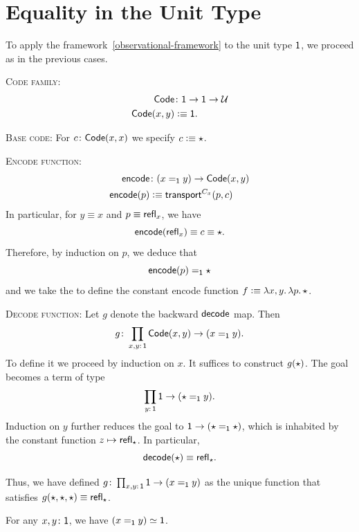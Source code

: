 \section{Equality in the Unit Type}

To apply the framework~\ref{observational-framework} to the unit type $\mathsf{1}$, we proceed as in the previous cases.

\textsc{Code family:}
\begin{align*}
    \fun{Code}&\colon\fun1\to\fun1\to\univ\\
    \fun{Code}(x,y)&\defeq\fun1.
\end{align*}

\textsc{Base code:}
For $c\colon\fun{Code}(x,x)$ we specify $c\mathrel{\vcentcolon}\equiv{\mathsf{\star}}$.

\textsc{Encode function:}
\begin{align*}
    \fun{encode}&\colon(x\eq{\fun1}y)\to\fun{Code}(x,y)\\
    \fun{encode}(p)&\defeq\fun{transport}^{C_x}(p,c)
\end{align*}
In particular, for $y\equiv x$ and $p\equiv\mathsf{refl}_x$, we have
\[
    \mathsf{encode}(\mathsf{refl}_x)\equiv c\equiv{\mathsf{\star}}.
\]
Therefore, by induction on $p$, we deduce that
\[
    \mathsf{encode}(p)\mathrel{=_{\mathsf{1}}}{\mathsf{\star}}
\]
and we take the \rhs to define the constant encode function $f\mathrel{\vcentcolon}\equiv\lambda x,y.\,\lambda p.\,{\mathsf{\star}}$.

\textsc{Decode function:}
Let $g$ denote the backward $\mathsf{decode}$ map. Then
\[
    g\colon\prod_{x,y\colon\fun1}\fun{Code}(x,y)\to(x\eq{\fun1}y).
\]
To define it we proceed by induction on $x$. It suffices to construct $g({\mathsf{\star}})$. The goal becomes a term of type
\[
    \prod_{y\colon\fun1}\fun1\to(\fstar\eq{\fun1}y).
\]
Induction on $y$ further reduces the goal to $\mathsf{1}\to({\mathsf{\star}}\mathrel{=_{\mathsf{1}}}{\mathsf{\star}})$, which is inhabited by the constant function $z\mapsto\mathsf{refl}_{\mathsf{\star}}$. In particular,
\begin{equation}\label{eq:decode(star)}
    \mathsf{decode}({\mathsf{\star}})\equiv\mathsf{refl}_{\mathsf{\star}}.
\end{equation}

Thus, we have defined $g\colon\prod_{x,y\colon\fun1}\fun1\to(x\eq{\fun1}y)$ as the unique function that satisfies $g({\mathsf{\star}},{\mathsf{\star}},{\mathsf{\star}}) \equiv \mathsf{refl}_{\mathsf{\star}}$.


\begin{thm}\label{thm:1-equivalence}
    For any\/ $x,y\colon\fun1$, we have\/ $(x\mathrel{=_{\mathsf{1}}}y)\simeq\mathsf{1}$.
\end{thm}

